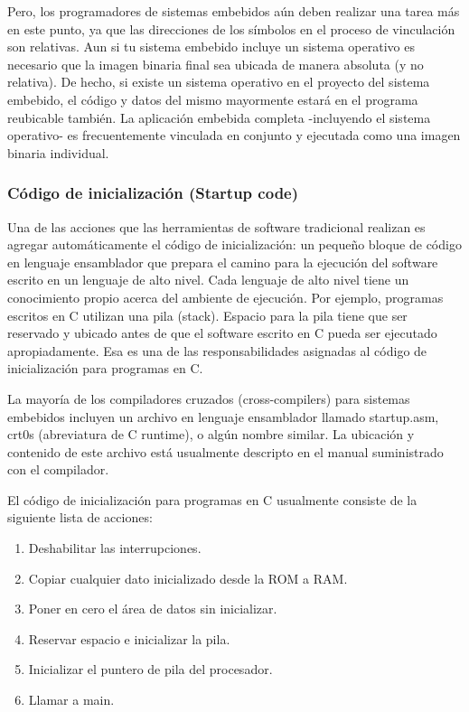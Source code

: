 \documentclass[output=paper, 
colorlinks,
citecolor=brown,
newtxmath
]{langscibook}
\begin{document}
Pero, los programadores de sistemas embebidos aún deben realizar una
tarea más en este punto, ya que 
las direcciones de los símbolos en el proceso de vinculación son relativas.
Aun si tu sistema embebido incluye un sistema operativo es necesario
que la imagen binaria final sea ubicada de manera absoluta (y no relativa).
De hecho, si existe un sistema operativo en el proyecto del sistema embebido,
el código y datos del mismo mayormente estará en el programa reubicable 
también.
La aplicación embebida completa -incluyendo el sistema operativo- es
frecuentemente vinculada en conjunto y ejecutada como una imagen binaria
individual.

\subsubsection {Código de inicialización (Startup code)}

Una de las acciones que las herramientas de software tradicional realizan
es agregar automáticamente el código de inicialización: un pequeño bloque
de código en lenguaje ensamblador que prepara el camino para la ejecución
del software escrito en un lenguaje de alto nivel. Cada lenguaje de alto
nivel tiene un conocimiento propio acerca del ambiente de ejecución.
Por ejemplo, programas escritos en C utilizan una pila (stack). Espacio
para la pila tiene que ser reservado y ubicado antes de que el software escrito
en C pueda ser ejecutado apropiadamente. Esa es una de las responsabilidades
asignadas al código de inicialización para programas en C.

La mayoría de los compiladores cruzados (cross-compilers) para sistemas
embebidos incluyen un archivo en lenguaje ensamblador llamado startup.asm, crt0s
(abreviatura de C runtime), o algún nombre similar. La ubicación y contenido de este
archivo está usualmente descripto en el manual suministrado con el compilador.

El código de inicialización para programas en C usualmente consiste de la siguiente
lista de acciones:

\begin{enumerate}
\item Deshabilitar las interrupciones.
\item Copiar cualquier dato inicializado desde la ROM a RAM.
\item Poner en cero el área de datos sin inicializar.
\item Reservar espacio e inicializar la pila.
\item Inicializar el puntero de pila del procesador.
\item Llamar a main.
\end{enumerate}
\end{document}
